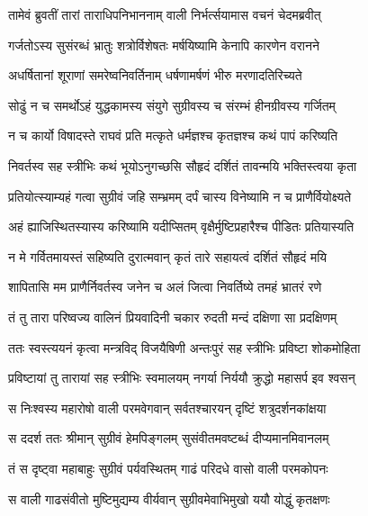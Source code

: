 
\twolineshloka
{तामेवं ब्रुवतीं तारां ताराधिपनिभाननाम्}
{वाली निर्भर्त्सयामास वचनं चेदमब्रवीत्} %

\twolineshloka
{गर्जतोऽस्य सुसंरब्धं भ्रातुः शत्रोर्विशेषतः}
{मर्षयिष्यामि केनापि कारणेन वरानने} %

\twolineshloka
{अधर्षितानां शूराणां समरेष्वनिवर्तिनाम्}
{धर्षणामर्षणं भीरु मरणादतिरिच्यते} %

\twolineshloka
{सोढुं न च समर्थोऽहं युद्धकामस्य संयुगे}
{सुग्रीवस्य च संरम्भं हीनग्रीवस्य गर्जितम्} %

\twolineshloka
{न च कार्यो विषादस्ते राघवं प्रति मत्कृते}
{धर्मज्ञश्च कृतज्ञश्च कथं पापं करिष्यति} %

\twolineshloka
{निवर्तस्व सह स्त्रीभिः कथं भूयोऽनुगच्छसि}
{सौहृदं दर्शितं तावन्मयि भक्तिस्त्वया कृता} %

\twolineshloka
{प्रतियोत्स्याम्यहं गत्वा सुग्रीवं जहि सम्भ्रमम्}
{दर्पं चास्य विनेष्यामि न च प्राणैर्वियोक्ष्यते} %

\twolineshloka
{अहं ह्याजिस्थितस्यास्य करिष्यामि यदीप्सितम्}
{वृक्षैर्मुष्टिप्रहारैश्च पीडितः प्रतियास्यति} %

\twolineshloka
{न मे गर्वितमायस्तं सहिष्यति दुरात्मवान्}
{कृतं तारे सहायत्वं दर्शितं सौहृदं मयि} %

\twolineshloka
{शापितासि मम प्राणैर्निवर्तस्व जनेन च}
{अलं जित्वा निवर्तिष्ये तमहं भ्रातरं रणे} %

\twolineshloka
{तं तु तारा परिष्वज्य वालिनं प्रियवादिनी}
{चकार रुदती मन्दं दक्षिणा सा प्रदक्षिणम्} %

\twolineshloka
{ततः स्वस्त्ययनं कृत्वा मन्त्रविद् विजयैषिणी}
{अन्तःपुरं सह स्त्रीभिः प्रविष्टा शोकमोहिता} %

\twolineshloka
{प्रविष्टायां तु तारायां सह स्त्रीभिः स्वमालयम्}
{नगर्या निर्ययौ क्रुद्धो महासर्प इव श्वसन्} %

\twolineshloka
{स निःश्वस्य महारोषो वाली परमवेगवान्}
{सर्वतश्चारयन् दृष्टिं शत्रुदर्शनकांक्षया} %

\twolineshloka
{स ददर्श ततः श्रीमान् सुग्रीवं हेमपिङ्गलम्}
{सुसंवीतमवष्टब्धं दीप्यमानमिवानलम्} %

\twolineshloka
{तं स दृष्ट्वा महाबाहुः सुग्रीवं पर्यवस्थितम्}
{गाढं परिदधे वासो वाली परमकोपनः} %

\twolineshloka
{स वाली गाढसंवीतो मुष्टिमुद्यम्य वीर्यवान्}
{सुग्रीवमेवाभिमुखो ययौ योद्धुं कृतक्षणः} %

